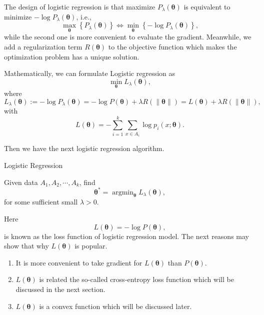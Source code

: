 The design of logistic regression is that 
maximize $P_\lambda(\bm\theta)$ is equivalent to minimize $-\log P_\lambda(\bm\theta)$, i.e.,
\begin{equation}\label{key}
\max_{\bm \theta} \left\{ P_\lambda(\bm\theta) \right\} \Leftrightarrow \min_{\bm \theta} \left\{ -\log   P_\lambda(\bm\theta)\right\},
\end{equation}
while the second one is more convenient to evaluate the gradient. Meanwhile, we add a regularization term $R(\bm\theta)$ to the objective function which makes the optimization problem has a unique solution. 

 Mathematically, we can formulate Logistic regression as
\begin{equation}
\min_{\bm\theta} L_\lambda(\bm \theta),
\end{equation}
where
\begin{equation}\label{eq:logisticlambda}
L_\lambda(\bm \theta)  := -\log P_\lambda(\bm\theta) = -\log P(\bm\theta) + \lambda R(\|\bm\theta\|) = L(\bm\theta) + \lambda R(\|\bm\theta\|),
\end{equation}
with
\begin{equation}\label{logistic}
L(\bm \theta) = - \sum_{i=1}^k \sum_{x\in A_i} \log p_{i}(x;\bm \theta).
\end{equation}



Then we have the next logistic regression algorithm.
\begin{algorithm}[H]
	\caption{Logistic Regression} 
	\label{alg:LR-R}
	Given data $A_1, A_2, \cdots, A_k$, find 
	\begin{equation}\label{key}
	\bm \theta^* = \mathop{\arg\min}_{\bm \theta}  L_\lambda(\bm \theta),
	\end{equation}
	for some sufficient small $\lambda > 0$.
\end{algorithm}

\begin{remark}
	Here
	\begin{equation}\label{key}
	L(\bm \theta)  = -\log P(\bm\theta),
	\end{equation}
	is known as the loss function of logistic regression model.
	The next reasons may show that why $L(\bm \theta)$ is popular.
	\begin{enumerate}
		\item It is more convenient to take gradient for $L(\bm \theta)$ than $P(\bm \theta)$.
		\item $L(\bm \theta)$ is related the so-called cross-entropy 
		loss function which will be discussed in the next section.
		\item $L(\bm \theta)$ is a convex function which will be discussed later.
	\end{enumerate}
\end{remark}



